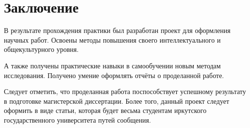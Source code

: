 \newpage
\section{Заключение}
	В результате прохождения практики был разработан проект для оформления
		научных работ. Освоены методы повышения своего интеллектуального
		и общекультурного уровня.

	А также получены практические навыки в самообучении
		новым методам исследования. Получено умение оформлять отчёты о
		проделанной работе.

	Следует отметить, что проделанная работа поспособствует успешному
		результату в подготовке магистерской диссертации. Более того,
		данный проект следует оформить в виде статьи, которая будет весьма
		студентам иркутского государственного университета путей сообщения.

